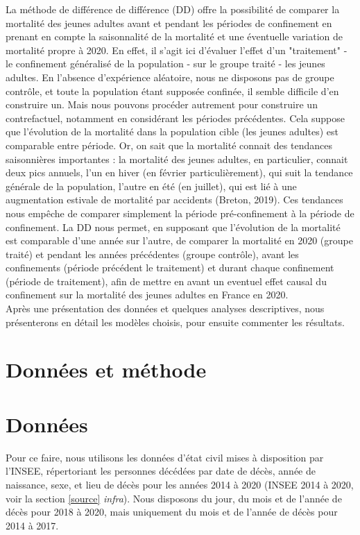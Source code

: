 \documentclass{article}
\begin{document}
La méthode de différence de différence (DD) offre la possibilité de comparer la mortalité des jeunes adultes avant et pendant les périodes de confinement en prenant en compte la saisonnalité de la mortalité et une éventuelle variation de mortalité propre à 2020. En effet, il s'agit ici d'évaluer l'effet d'un "traitement" - le confinement généralisé de la population - sur le groupe traité - les jeunes adultes. En l'absence d'expérience aléatoire, nous ne disposons pas de groupe contrôle, et toute la population étant supposée confinée, il semble difficile d'en construire un. Mais nous pouvons procéder autrement pour construire un contrefactuel, notamment en considérant les périodes précédentes. Cela suppose que l’évolution de la mortalité dans la population cible (les jeunes adultes) est comparable entre période. Or, on sait que la mortalité connait des tendances saisonnières importantes : la mortalité des jeunes adultes, en particulier, connait deux pics annuels, l'un en hiver (en février particulièrement), qui suit la tendance générale de la population, l'autre en été (en juillet), qui est lié à une augmentation estivale de mortalité par accidents (Breton, 2019). Ces tendances nous empêche de comparer simplement la période pré-confinement à la période de confinement. La DD nous permet, en supposant que l'évolution de la mortalité est comparable d'une année sur l'autre, de comparer la mortalité en 2020 (groupe traité) et pendant les années précédentes (groupe contrôle), avant les confinements (période précédent le traitement) et durant chaque confinement (période de traitement), afin de mettre en avant un eventuel effet causal du confinement sur la mortalité des jeunes adultes en France en 2020. \\

Après une présentation des données et quelques analyses descriptives, nous présenterons en détail les modèles choisis, pour ensuite commenter les résultats.

\section{Données et méthode}






\section{Données}

Pour ce faire, nous utilisons les données d'état civil mises à disposition par l'INSEE, répertoriant les personnes décédées par date de décès, année de naissance, sexe, et lieu de décès pour les années 2014 à 2020 (INSEE 2014 à 2020, voir la section \ref{source} \textit{infra}). Nous disposons du jour, du mois et de l'année de décès pour 2018 à 2020, mais uniquement du mois et de l'année de décès pour 2014 à 2017.
\end{document}
